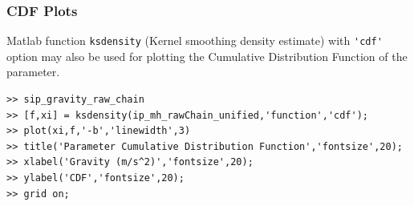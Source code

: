 

\subsubsection{CDF Plots}

Matlab function \verb+ksdensity+ (Kernel smoothing density estimate) with \verb+'cdf'+ option may also be used for plotting the Cumulative Distribution Function of the parameter.


\begin{lstlisting}[label=matlab:cdf,caption={Matlab code for the CDF plot.}]
% inside Matlab
>> sip_gravity_raw_chain
>> [f,xi] = ksdensity(ip_mh_rawChain_unified,'function','cdf');
>> plot(xi,f,'-b','linewidth',3)
>> title('Parameter Cumulative Distribution Function','fontsize',20);
>> xlabel('Gravity (m/s^2)','fontsize',20);
>> ylabel('CDF','fontsize',20);
>> grid on;
\end{lstlisting}

